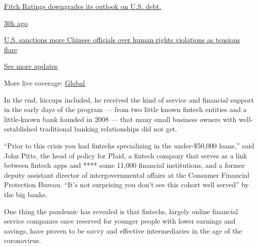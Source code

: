 \href{https://www.nytimes3xbfgragh.onion/live/2020/07/31/business/stock-market-today-coronavirus?action=click\&pgtype=Article\&state=default\&region=MAIN_CONTENT_1\&context=storylines_live_updates\#fitch-ratings-downgrades-its-outlook-on-us-debt}{Fitch
Ratings downgrades its outlook on U.S. debt.}

\href{https://www.nytimes3xbfgragh.onion/live/2020/07/31/business/stock-market-today-coronavirus?action=click\&pgtype=Article\&state=default\&region=MAIN_CONTENT_1\&context=storylines_live_updates\#us-sanctions-more-chinese-officials-over-human-rights-violations-as-tensions-flare}{30h
ago}

\href{https://www.nytimes3xbfgragh.onion/live/2020/07/31/business/stock-market-today-coronavirus?action=click\&pgtype=Article\&state=default\&region=MAIN_CONTENT_1\&context=storylines_live_updates\#us-sanctions-more-chinese-officials-over-human-rights-violations-as-tensions-flare}{U.S.
sanctions more Chinese officials over human rights violations as
tensions flare}

\href{https://www.nytimes3xbfgragh.onion/live/2020/07/31/business/stock-market-today-coronavirus?action=click\&pgtype=Article\&state=default\&region=MAIN_CONTENT_1\&context=storylines_live_updates}{See
more updates}

More live coverage:
\href{https://www.nytimes3xbfgragh.onion/2020/08/01/world/coronavirus-covid-19.html?action=click\&pgtype=Article\&state=default\&region=MAIN_CONTENT_1\&context=storylines_live_updates}{Global}

In the end, hiccups included, he received the kind of service and
financial support in the early days of the program --- from two little
known fintech entities and a little-known bank founded in 2008 --- that
many small business owners with well-established traditional banking
relationships did not get.

``Prior to this crisis you had fintechs specializing in the
under-\$50,000 loans,'' said John Pitts, the head of policy for Plaid, a
fintech company that serves as a link between fintech apps and **** some
11,000 financial institutions, and a former deputy assistant director of
intergovernmental affairs at the Consumer Financial Protection Bureau.
``It's not surprising you don't see this cohort well served'' by the big
banks.

One thing the pandemic has revealed is that fintechs, largely online
financial service companies once reserved for younger people with lower
earnings and savings, have proven to be savvy and effective
intermediaries in the age of the coronavirus.

